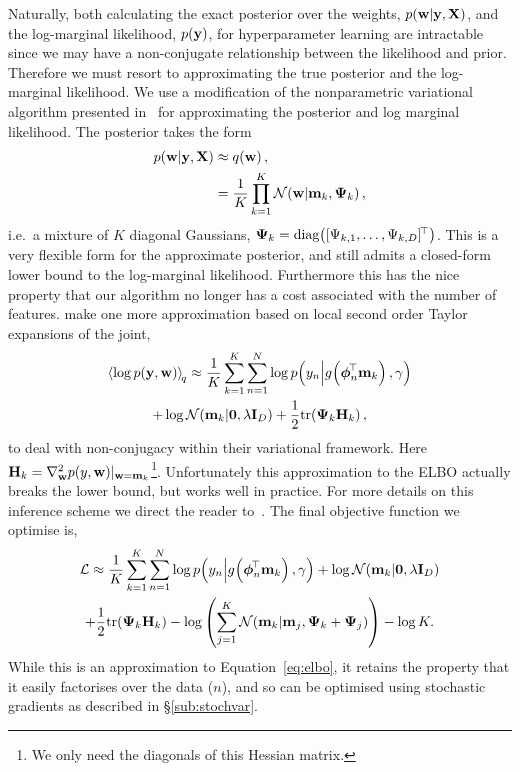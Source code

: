 \documentclass[11pt, oneside]{article}
\begin{document}
Naturally, both calculating the exact posterior over the weights,
$\probC{\weights}{\targ, \ins}$, and the log-marginal likelihood,
$\prob{\targ}$, for hyperparameter learning are intractable since we may have a
non-conjugate relationship between the likelihood and prior. Therefore we must
resort to approximating the true posterior and the log-marginal likelihood.
We use a modification of the nonparametric variational algorithm
presented in~\cite{gershman2012} for approximating the posterior and log
marginal likelihood. The posterior takes the form
\begin{align}
    \probC{\weights}{\targ, \ins} &\approx \qrob{\weights}, \nonumber \\
    &= \frac{1}{K} \prod^K_{k=1} \gausC{\weights}{\pomean_k, \dpocov_k},
\end{align}
i.e.\ a mixture of $K$ diagonal Gaussians, $\dpocov_k = \diag{[\dpocovs_{k,1},
    \ldots, \dpocovs_{k, D}]\T}$. This is a very flexible form for the
approximate posterior, and still admits a closed-form lower bound to the
log-marginal likelihood. Furthermore this has the nice property that our
algorithm no longer has a  cost associated with the number of
features. \citet{gershman2012} make one more approximation based on local
second order Taylor expansions of the joint,
\begin{multline}
    \expec{q}{\log \prob{\targ, \weights}} \approx
    \frac{1}{K} \sum^K_{k=1} \sum^N_{n=1} 
    \log \probC{\targs_n}{\activ{\feats_n\T \pomean_k}, \lparam} \\
    + \log \gausC{\pomean_k}{\mathbf{0}, \reg\ident{D}}
    + \frac{1}{2} \trace{\dpocov_k\hess{k}},
\end{multline}
to deal with non-conjugacy within their variational framework. Here $\hess{k} =
\nabla^2_{\weights} \prob{\targs, \weights}\!|_{\weights =
    \pomean_k}$\footnote{We only need the diagonals of this Hessian matrix.}.
Unfortunately this approximation to the ELBO actually breaks the lower bound,
but works well in practice. For more details on this inference scheme we direct
the reader to~\cite{gershman2012}. The final objective function we optimise is,
\begin{multline}
    \elbo \approx
    \frac{1}{K} \sum^K_{k=1} \sum^N_{n=1} 
    \log \probC{\targs_n}{\activ{\feats_n\T \pomean_k}, \lparam}
    + \log \gausC{\pomean_k}{\mathbf{0}, \reg\ident{D}} \\
    + \frac{1}{2} \trace{\dpocov_k\hess{k}}
    - \log \brac{\sum^K_{j=1} \gausC{\pomean_k}{\pomean_j, \dpocov_k +
            \dpocov_j}} - \log K. \label{eq:glmobj}
\end{multline}
While this is an approximation to Equation~\eqref{eq:elbo}, it retains the
property that it easily factorises over the data ($n$), and so can be optimised
using stochastic gradients as described in \S\ref{sub:stochvar}.
\end{document}
